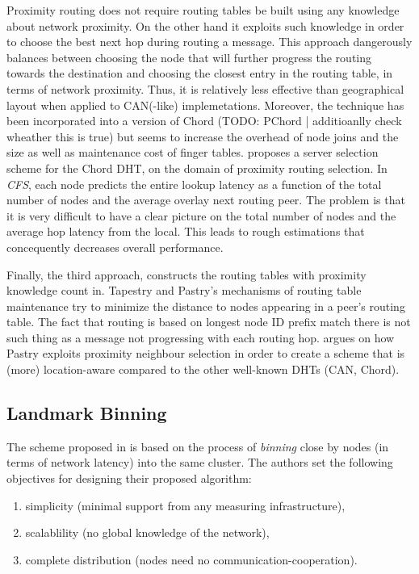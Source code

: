 \documentclass[a4paper,10pt]{article}
\begin{document}
Proximity routing does not require routing tables be built using any knowledge about network proximity. On the other hand it exploits such knowledge in order to choose the best next hop during routing a message. This approach dangerously balances between choosing the node that will further progress the routing towards the destination and choosing the closest entry in the routing table, in terms of network proximity. Thus, it is relatively less effective than geographical layout when applied to CAN(-like) implemetations. Moreover, the technique has been incorporated into a version of Chord (TODO: PChord | additioanlly check wheather this is true) but seems to increase the overhead of node joins and the size as well as maintenance cost of finger tables. \cite{dabek_cfs_2001} proposes a server selection scheme for the Chord DHT, on the domain of proximity routing selection. In \emph{CFS}, each node predicts the entire lookup latency as a function of the total number of nodes and the average overlay next routing peer. The problem is that it is very difficult to have a clear picture on the total number of nodes and the average hop latency from the local. This leads to rough estimations that concequently decreases overall performance.

Finally, the third approach, constructs the routing tables with proximity knowledge count in. Tapestry and Pastry's mechanisms of routing table maintenance try to minimize the distance to nodes appearing in a peer's routing table. The fact that routing is based on longest node ID prefix match there is not such thing as a message not progressing with each routing hop. \cite{castro_proximityp2p_2002} argues on how Pastry exploits proximity neighbour selection in order to create a scheme that is (more) location-aware compared to the other well-known DHTs (CAN, Chord).

\subsection{Landmark Binning}
The scheme proposed in \cite{ratnasamy_binning_2002} is based on the process of \emph{binning} close by nodes (in terms of network latency) into the same cluster. The authors set the following objectives for designing their proposed algorithm:
\begin{enumerate}
 \item simplicity (minimal support from any measuring infrastructure),
 \item scalablility (no global knowledge of the network),
 \item complete distribution (nodes need no communication-cooperation).
\end{enumerate}
\end{document}
